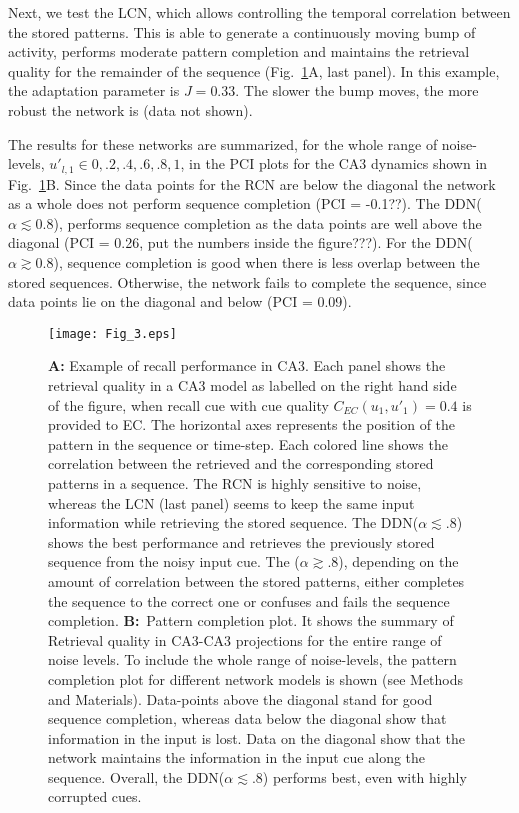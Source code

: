 \documentclass[utf8]{frontiersSCNS} %
\begin{document}
Next, we test the LCN, which allows controlling the temporal correlation between the stored patterns. This is able to generate a continuously moving bump of activity, performs moderate pattern completion and maintains the retrieval quality for the remainder of the sequence (Fig.~\ref{Fig_3}A, last panel).
In this example, the adaptation parameter is $J = 0.33$. The slower the bump moves, the more robust the network is (data not shown).
 
The results for these networks are summarized, for the whole range of noise-levels, $u'_{l, 1} \in  { 0, .2, .4, .6, .8, 1 } $, in the PCI plots for the CA3 dynamics shown in Fig.~\ref{Fig_3}B. Since the data points for the RCN are below the diagonal the network as a whole does not perform sequence completion (PCI = -0.1??).
% 
The DDN($\alpha \lesssim 0.8 $), performs sequence completion as the data points are well above the diagonal (PCI = 0.26, put the numbers inside the figure???). For the DDN($\alpha \gtrsim 0.8 $), sequence completion is good when there is less overlap between the stored sequences. Otherwise, the network fails to complete the sequence, since data points lie on the diagonal and below (PCI = 0.09).  
%
\begin{figure}[!htb]
\centering\texttt{[image: Fig\_3.eps]}
\caption{\textbf{A:} Example of recall performance in CA3. 
Each panel shows the retrieval quality in a CA3 model as labelled on the right hand side of the figure, when recall cue with cue quality $C_{EC}(u_1, u'_1) = 0.4$ is provided to EC.
The horizontal axes represents the position of the pattern in the sequence or time-step. Each colored line shows the correlation between the retrieved and the corresponding stored patterns in a sequence.
The RCN is highly sensitive to noise, whereas the LCN (last panel) seems to keep the same input information while retrieving the stored sequence. 
The DDN($\alpha \lesssim .8$) shows the best performance and retrieves the previously stored sequence from the noisy input cue. The ($\alpha \gtrsim .8$), depending on the amount of correlation between the stored patterns, either completes the sequence to the correct one or confuses and fails the sequence completion.
\textbf{B:}~Pattern completion plot. It shows the summary of Retrieval quality in CA3-CA3 projections for the entire range of noise levels.
To include the whole range of noise-levels, the pattern completion plot for different network models is shown (see Methods and Materials). Data-points above the diagonal stand for good sequence completion, whereas data below the diagonal show that information in the input is lost. Data on the diagonal show that the network maintains the information in the input cue along the sequence. Overall, the DDN($\alpha \lesssim .8$) performs best, even with highly corrupted cues. 
 }
\label{Fig_3}
\end{figure}
\end{document}
